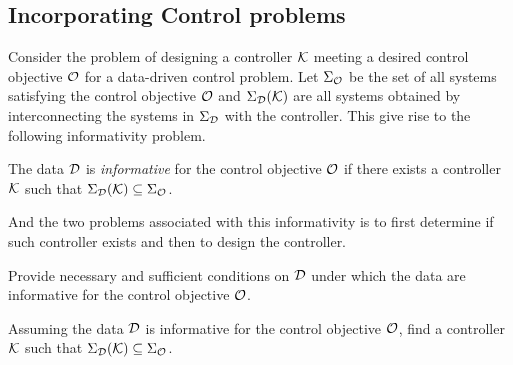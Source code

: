 \subsection{Incorporating Control problems}
Consider the problem of designing a controller $\mathcal{K}$ meeting a desired control objective $\cal{O}$ for a data-driven control problem. Let $\Sigma_{\mathcal{O}}$ be the set of all systems satisfying the control objective $\mathcal{O}$ and $\Sigma_{\mathcal{D}}(\mathcal{K})$ are all systems obtained by interconnecting the systems in $\Sigma_{\mathcal{D}}$ with the controller. This give rise to the following informativity problem.
\begin{definition}\label{ch1:def:par informativity}
The data $\mathcal{D}$ is \textit{informative} for the control objective $\mathcal{O}$ if there exists a controller $\mathcal{K}$ such that $\Sigma_{\mathcal{D}}(\mathcal{K}) \subseteq \Sigma_{\mathcal{O}}$. 
\end{definition}
And the two problems associated with this informativity is to first determine if such controller exists and then to design the controller.
\begin{problem}\label{ch1:prob:parametrized}
Provide necessary and sufficient conditions on $\mathcal{D}$ under which the data are informative for the control objective $\mathcal{O}$. 
\end{problem}
\begin{problem}\label{ch1:prob:design}
	Assuming the data $\mathcal{D}$ is informative for the control objective $\mathcal{O}$, find a controller $\mathcal{K}$ such that $\Sigma_{\mathcal{D}} (\mathcal{K}) \subseteq \Sigma_{\mathcal{O}}$. 
\end{problem}

